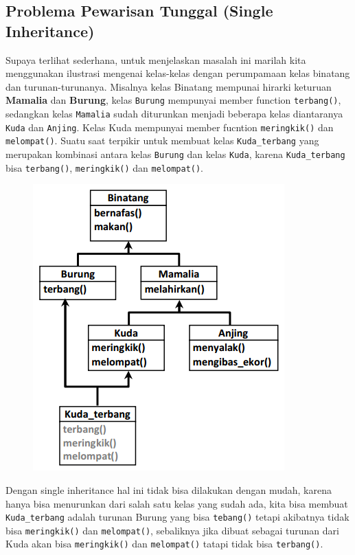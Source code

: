 \subsection{Problema Pewarisan Tunggal (Single
Inheritance)}\label{problema-pewarisan-tunggal-single-inheritance}

Supaya terlihat sederhana, untuk menjelaskan masalah ini marilah kita
menggunakan ilustrasi mengenai kelas-kelas dengan perumpamaan kelas
binatang dan turunan-turunanya. Misalnya kelas Binatang mempunai hirarki
keturuan \textbf{Mamalia} dan \textbf{Burung}, kelas \texttt{Burung}
mempunyai member function \texttt{terbang()}, sedangkan kelas
\texttt{Mamalia} sudah diturunkan menjadi beberapa kelas diantaranya
\texttt{Kuda} dan \texttt{Anjing}. Kelas Kuda mempunyai member fucntion
\texttt{meringkik()} dan \texttt{melompat()}. Suatu saat terpikir untuk
membuat kelas \texttt{Kuda\_terbang} yang merupakan kombinasi antara
kelas \texttt{Burung} dan kelas \texttt{Kuda}, karena
\texttt{Kuda\_terbang} bisa \texttt{terbang()}, \texttt{meringkik()} dan
\texttt{melompat()}.

\begin{figure}[htbp]
\centering
\includegraphics{images/capture8-1.png}
\caption{}
\end{figure}

Dengan single inheritance hal ini tidak bisa dilakukan dengan mudah,
karena hanya bisa menurunkan dari salah satu kelas yang sudah ada, kita
bisa membuat \texttt{Kuda\_terbang} adalah turunan Burung yang bisa
\texttt{tebang()} tetapi akibatnya tidak bisa \texttt{meringkik()} dan
\texttt{melompat()}, sebaliknya jika dibuat sebagai turunan dari Kuda
akan bisa \texttt{meringkik()} dan \texttt{melompat()} tatapi tidak bisa
\texttt{terbang()}.

